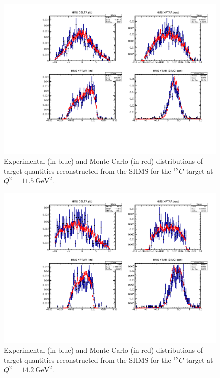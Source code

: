 \begin{figure}[!h]
    \centering
    \includegraphics[page=2,width=1.0\textwidth]{pass5_report/Report_c115.pdf}
    \caption{
            Experimental (in blue) and Monte Carlo (in red) distributions of
            target quantities reconstructed from the SHMS for
            the ${}^{12}C$ target at $Q^2=\SI{11.5}{\giga\electronvolt\squared}$.
            }
    \label{fig:Report_c115.pdf}
\end{figure}


\begin{figure}[!h]
    \centering
    \includegraphics[page=2,width=1.0\textwidth]{pass5_report/Report_c143_sm.pdf}
    \caption{
            Experimental (in blue) and Monte Carlo (in red) distributions of
            target quantities reconstructed from the SHMS for
            the ${}^{12}C$ target at $Q^2=\SI{14.2}{\giga\electronvolt\squared}$.
            }
    \label{fig:Report_c143_sm.pdf}
\end{figure}


